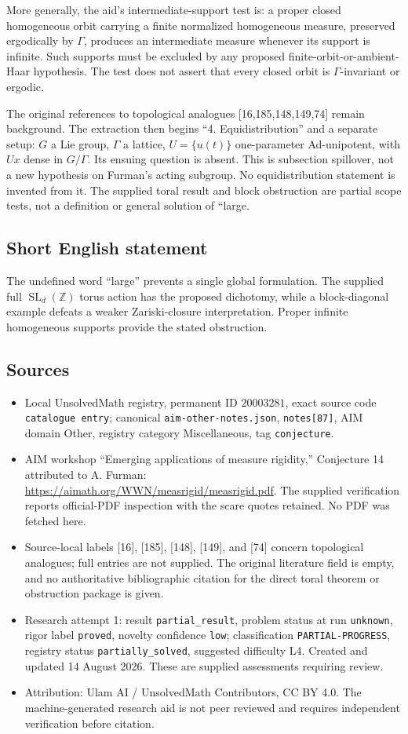\documentclass[11pt]{article}
\newcommand{\Z}{\mathbb{Z}}
\begin{document}
More generally, the aid's intermediate-support test is: a proper closed homogeneous orbit carrying a finite normalized homogeneous measure, preserved ergodically by \(\Gamma\), produces an intermediate measure whenever its support is infinite. Such supports must be excluded by any proposed finite-orbit-or-ambient-Haar hypothesis. The test does not assert that every closed orbit is \(\Gamma\)-invariant or ergodic.

The original references to topological analogues [16,185,148,149,74] remain background. The extraction then begins ``4. Equidistribution'' and a separate setup: \(G\) a Lie group, \(\Gamma\) a lattice, \(U=\{u(t)\}\) one-parameter Ad-unipotent, with \(Ux\) dense in \(G/\Gamma\). Its ensuing question is absent. This is subsection spillover, not a new hypothesis on Furman's acting subgroup. No equidistribution statement is invented from it. The supplied toral result and block obstruction are partial scope tests, not a definition or general solution of ``large.
\subsection{Short English statement}
The undefined word ``large'' prevents a single global formulation. The supplied full \(\operatorname{SL}_d(\Z)\) torus action has the proposed dichotomy, while a block-diagonal example defeats a weaker Zariski-closure interpretation. Proper infinite homogeneous supports provide the stated obstruction.
\subsection{Sources}
\begin{itemize}
\item Local UnsolvedMath registry, permanent ID \(20003281\), exact source code \texttt{catalogue entry}; canonical \texttt{aim-other-notes.json}, \texttt{notes[87]}, AIM domain Other, registry category Miscellaneous, tag \texttt{conjecture}.
\item AIM workshop ``Emerging applications of measure rigidity,'' Conjecture 14 attributed to A. Furman: \url{https://aimath.org/WWN/measrigid/measrigid.pdf}. The supplied verification reports official-PDF inspection with the scare quotes retained. No PDF was fetched here.
\item Source-local labels [16], [185], [148], [149], and [74] concern topological analogues; full entries are not supplied. The original literature field is empty, and no authoritative bibliographic citation for the direct toral theorem or obstruction package is given.
\item Research attempt 1: result \texttt{partial\_result}, problem status at run \texttt{unknown}, rigor label \texttt{proved}, novelty confidence \texttt{low}; classification \texttt{PARTIAL-PROGRESS}, registry status \texttt{partially\_solved}, suggested difficulty L4. Created and updated 14 August 2026. These are supplied assessments requiring review.
\item Attribution: Ulam AI / UnsolvedMath Contributors, CC BY 4.0. The machine-generated research aid is not peer reviewed and requires independent verification before citation.
\end{itemize}
\end{document}
